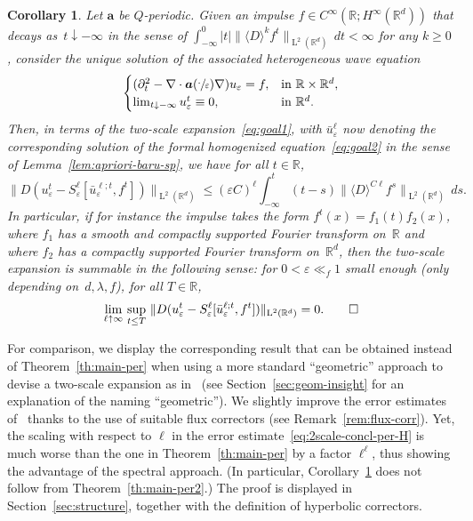 \documentclass[JEP,XML,SOM,Unicode,published]{cedram}
\theoremstyle{plain}
\newtheorem{cor10}{Corollary}
\newenvironment{cor1}
{\renewcommand{\qedsymbol}{$\lozenge$}\pushQED{\qed}\begin{cor10}}
{\popQED\end{cor10}}
\theoremstyle{definition}
\numberwithin{equation}{section}
\newcommand{\e}{\varepsilon}
\newcommand{\R}{\mathbb R}
\newcommand{\Aa}{\boldsymbol a}
\newcommand{\Ld}{\operatorname{L}}
\begin{document}
\begin{cor1}\label{cor:summable}
Let $\Aa$ be $Q$-periodic. Given an impulse $f\in C^\infty(\R;H^\infty(\R^d))$ that decays as~$t\downarrow-\infty$ in the sense of $\int_{-\infty}^0|t|\|\langle D\rangle^kf^t\|_{\Ld^2(\R^d)}\,dt<\infty$ for any $k\ge0$,
consider the unique solution of the associated heterogeneous wave equation
\begin{equation*}
\begin{cases}
(\partial_t^2-\nabla\cdot\Aa(\sfrac\cdot\e)\nabla)u_\e=f,&\text{in $\R\times\R^d$},\\
{\lim_{t\downarrow -\infty}u_\e^t \equiv 0},&\text{in $\R^d$}.
\end{cases}
\end{equation*}
Then, in terms of the two-scale expansion~\eqref{eq:goal1}, with $\bar u_\e^\ell$ now denoting the corresponding solution of the formal homogenized equation~\eqref{eq:goal2} in the sense of Lemma~\ref{lem:apriori-baru-sp}, we have for all $t\in \R$,
\begin{equation}\label{e.bound-summable-1}
\|D(u_\e^t-S^{\ell}_\e[\bar u_\e^{\ell;t},f^t])\|_{\Ld^2(\R^d)} \le
(\e C)^\ell \int_{-\infty}^t(t-s)\|\langle D\rangle^{C\ell} f^s\|_{\Ld^2(\R^d)}\,ds.
\end{equation}
In particular, if for instance the impulse takes the form $f^t(x)=f_1(t)f_2(x)$, where $f_1$ has a smooth and compactly supported Fourier transform on~$\R$ and where $f_2$ has a compactly supported Fourier transform on~$\R^d$,
then the two-scale expansion is summable in the following sense: for $0<\e\ll_f 1$ small enough (only depending on~$d,\lambda,f$), for all $T\in\R$,
\begin{equation}\label{e.bound-summable-2}
\lim_{\ell\uparrow\infty}\,\sup_{t\le T}\,\|D(u_\e^t-S^{\ell}_\e[\bar u_\e^{\ell;t},f^t])\|_{\Ld^2(\R^d)} =0. \qedhere
\end{equation}
\end{cor1}

For comparison,
we display the corresponding result that can be obtained instead of Theorem~\ref{th:main-per} when using a more standard ``geometric'' approach to devise a two-scale expansion as in~\cite{ALR,Pouch-17,Pouch-19} (see Section~\ref{sec:geom-insight} for an explanation of the naming ``geometric'').
We slightly improve the error estimates of~\cite{ALR} thanks to {the} use of suitable flux correctors (see Remark~\ref{rem:flux-corr}). Yet, the scaling with respect to $\ell$ in the error estimate~\eqref{eq:2scale-concl-per-H} is much worse than the one in Theorem~\ref{th:main-per} by a factor $\ell^\ell$, thus showing the advantage of the spectral approach.
(In particular, Corollary~\ref{cor:summable} does not follow from Theorem~\ref{th:main-per2}.)
The proof is displayed in Section~\ref{sec:structure}, together with the definition of hyperbolic correctors.
\end{document}
